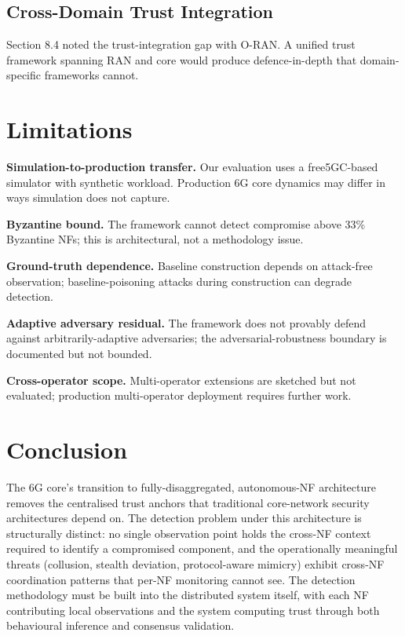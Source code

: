 \documentclass[sigconf,nonacm]{acmart}
\begin{document}
\subsection{Cross-Domain Trust Integration}

Section 8.4 noted the trust-integration gap with O-RAN. A unified
trust framework spanning RAN and core would produce
defence-in-depth that domain-specific frameworks cannot.

\section{Limitations}

\textbf{Simulation-to-production transfer.} Our evaluation uses a
free5GC-based simulator with synthetic workload. Production 6G
core dynamics may differ in ways simulation does not capture.

\textbf{Byzantine bound.} The framework cannot detect compromise
above 33\% Byzantine NFs; this is architectural, not a
methodology issue.

\textbf{Ground-truth dependence.} Baseline construction depends on
attack-free observation; baseline-poisoning attacks during
construction can degrade detection.

\textbf{Adaptive adversary residual.} The framework does not
provably defend against arbitrarily-adaptive adversaries; the
adversarial-robustness boundary is documented but not bounded.

\textbf{Cross-operator scope.} Multi-operator extensions are
sketched but not evaluated; production multi-operator deployment
requires further work.

\section{Conclusion}

The 6G core's transition to fully-disaggregated, autonomous-NF
architecture removes the centralised trust anchors that
traditional core-network security architectures depend on. The
detection problem under this architecture is structurally distinct:
no single observation point holds the cross-NF context required to
identify a compromised component, and the operationally meaningful
threats (collusion, stealth deviation, protocol-aware mimicry)
exhibit cross-NF coordination patterns that per-NF monitoring
cannot see. The detection methodology must be built into the
distributed system itself, with each NF contributing local
observations and the system computing trust through both
behavioural inference and consensus validation.
\end{document}
